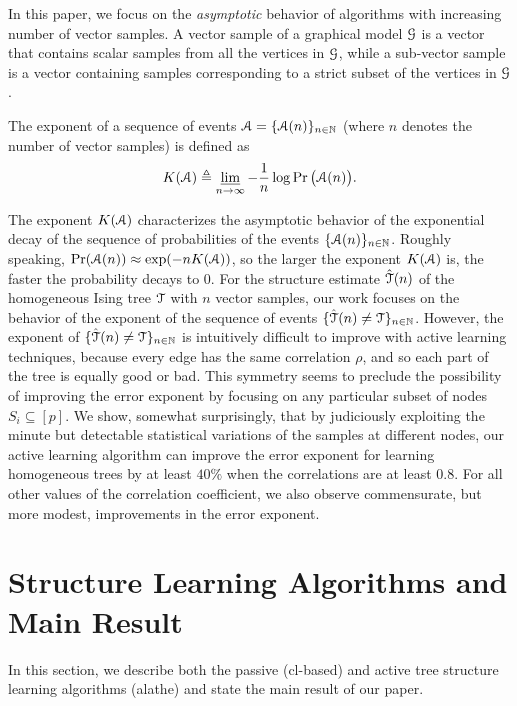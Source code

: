 In this paper, we focus on the \emph{asymptotic} behavior  of algorithms with   increasing number of vector samples. A vector sample of a graphical model $\mathcal{G}$ is a vector that contains scalar samples from  all the vertices in $\mathcal{G}$, while a 
sub-vector sample is a vector containing samples corresponding to a strict subset of the vertices in $\mathcal{G}$. %
\begin{definition}[Exponent]
	The exponent of a sequence of events $\mathcal{A}=\{\mathcal{A}(n)\}_{n\in\mathbb{N}}$ (where $n$ denotes the number of vector samples) is defined as
	\begin{align}
		K(\mathcal{A})\triangleq \varliminf_{n\rightarrow \infty}-\frac{1}{n}\log\Pr\big(\mathcal{A}(n)\big).
	\end{align}
\end{definition}
The exponent $K(\mathcal{A})$ characterizes the asymptotic behavior of the exponential decay of the sequence of  probabilities of the events $\{\mathcal{A} (n)\}_{n\in\mathbb{N}}$. Roughly speaking, 
$\Pr(\mathcal{A}(n))\approx \exp (-n K(\mathcal{A}) )$, 
so the larger the exponent $K(\mathcal{A})$ is, the faster the   probability decays to $0$.
For the structure estimate $\hat{\mathcal{T}}(n)$ of the homogeneous Ising tree $\mathcal{T}$ with $n$ vector samples, our work focuses on the behavior of the exponent of the sequence of events $\{\hat{\mathcal{T}}(n)\neq \mathcal{T}\}_{n\in\mathbb{N}}$. However, the exponent of $\{\hat{\mathcal{T}}(n)\neq \mathcal{T}\}_{n\in\mathbb{N}}$ is intuitively difficult to improve with active learning techniques, because every edge has the same correlation $\rho$, and so each part of the tree is equally good or bad. This   symmetry seems to preclude the possibility of improving the error exponent by focusing on any   particular subset of nodes $S_{i} \subseteq[p]$. We show, somewhat surprisingly,
that by judiciously exploiting the minute but detectable statistical variations of the samples at
different nodes, our active learning algorithm can improve the error exponent for learning homogeneous trees by at least $40\%$
when the correlations are at least $0.8$. For all other values of the correlation coefficient, we also
observe commensurate, but more modest, improvements in the error exponent.

\section{Structure Learning Algorithms and Main Result} \label{sec:structure}
In this section, we describe both the passive (\ac{cl}-based) and active tree structure learning algorithms  (\ac{alathe}) and state the main result of our paper.
